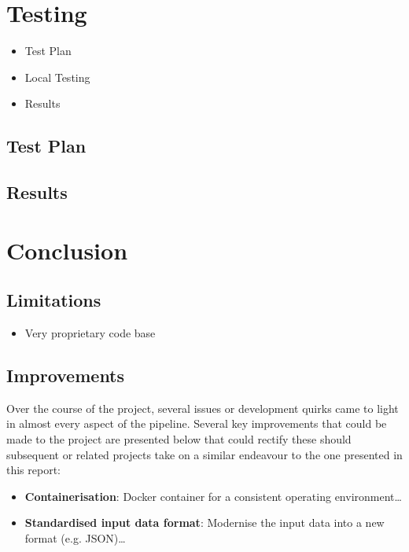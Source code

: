 \documentclass[conference]{IEEEtran}
\begin{document}
\section{Testing}
\label{sec:testing}

\begin{itemize}
    \item Test Plan
    \item Local Testing
    \item Results
\end{itemize}


\subsection{Test Plan}

\subsection{Results}



\section{Conclusion}
\label{sec:conclusion}

\subsection{Limitations}

\begin{itemize}
    \item Very proprietary code base
\end{itemize}

\subsection{Improvements}

Over the course of the project, several issues or development quirks came to light in almost every aspect of the pipeline. Several key improvements that could be made to the project are presented below that could rectify these should subsequent or related projects take on a similar endeavour to the one presented in this report:

\begin{itemize}
    \item \textbf{Containerisation}: Docker container for a consistent operating environment\dots
    \item \textbf{Standardised input data format}: Modernise the input data into a new format (e.g. JSON)\dots
\end{itemize}




\end{document}
